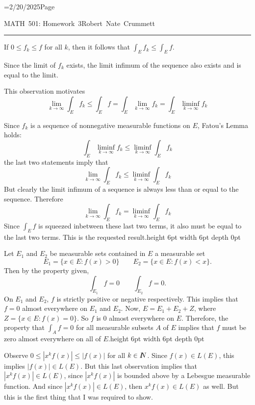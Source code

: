 \footline={2/20/2025\hfill Page \folio}
\def\reals{I\kern-4pt R}
\def\nats{I\kern-4pt N}
\let\oldexists\exists \def\exists{\oldexists \;}
\let\oldforall\forall \def\forall{\oldforall \,}
\def\qed{\vrule height 6pt width 6pt depth 0pt}
\parindent 0pt
\parskip 2mm


MATH~501: Homework~3\hfill Robert~Nate~Crummett
\smallskip
\hrule




If $0\leq f_k\leq f$ for all $k$, then it follows that $\int_Ef_k\leq\int_Ef$.

Since the limit of $f_k$ exists, the limit infimum of the sequence also exists and is equal to the limit.

This observation motivates
$$\lim_{k\to\infty}\int_Ef_k\leq\int_Ef=\int_E\lim_{k\to\infty}f_k=\int_E\liminf_{k\to\infty}f_k$$

Since $f_k$ is a sequence of nonnegative measurable functions on $E$, Fatou's Lemma holds:
$$\int_E\liminf_{k\to\infty}f_k\leq\liminf_{k\to\infty}\int_Ef_k$$
the last two statements imply that
$$\lim_{k\to\infty}\int_Ef_k\leq\liminf_{k\to\infty}\int_Ef_k$$
But clearly the limit infimum of a sequence is always less than or equal to the sequence.
Therefore
$$\lim_{k\to\infty}\int_Ef_k=\liminf_{k\to\infty}\int_Ef_k$$
Since $\int_Ef$ is squeezed inbetween these last two terms, it also must be equal to the last two terms.
This is the requested result.\hfill\qed\kern3pt{}




Let $E_1$ and $E_2$ be measurable sets contained in $E$ a measurable set
$$E_1=\{x\in E:f(x)>0\}\qquad E_2=\{x\in E:f(x)<x\}.$$
Then by the property given,
$$\int_{E_1}f=0\qquad\int_{E_2}f=0.$$
On $E_1$ and $E_2$, $f$ is strictly positive or negative respectively.
This implies that $f=0$ almost everywhere on $E_1$ and $E_2$.
Now, $E = E_1 + E_2 + Z$, where $Z=\{x\in E:f(x)=0\}$.
So $f$ is 0 almost everywhere on $E$.
Therefore, the property that $\int_Af=0$ for all measurable subsets $A$ of $E$ implies that $f$ must be zero almost everywhere on all of $E$.\hfill\qed\kern3pt{}




Observe $0\leq|x^kf(x)|\leq|f(x)|$ for all $k\in\nats$.
Since $f(x)\in L(E)$, this implies $|f(x)|\in L(E)$.
But this last observation implies that $|x^kf(x)|\in L(E)$, since $|x^kf(x)|$ is bounded above by a Lebesgue measurable function.
And since $|x^kf(x)|\in L(E)$, then $x^kf(x)\in L(E)$ as well.
But this is the first thing that I was required to show.

